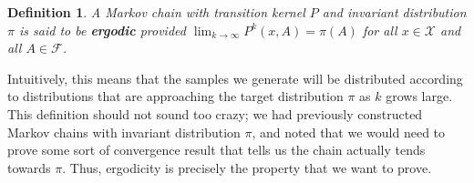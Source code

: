 \documentclass[12pt]{article}
\newtheorem{definition}{Definition}
\begin{document}
\begin{definition}
A Markov chain with transition kernel $P$ and invariant distribution $\pi$ is said to be \textbf{ergodic} provided $\lim_{k \to \infty} P^k(x, A) = \pi(A)$ for all 
$x \in \mathcal{X}$ and all $A \in \mathcal{F}$. 
\end{definition}

Intuitively, this means that the samples we generate will be distributed according to distributions that are approaching the target distribution $\pi$ as $k$ grows large. 
This definition should not sound too crazy; we had previously constructed Markov chains with invariant distribution $\pi$, and noted that we would need to prove some 
sort of convergence result that tells us the chain actually tends towards $\pi$. Thus, ergodicity is precisely the property that we want to prove.  
\end{document}
